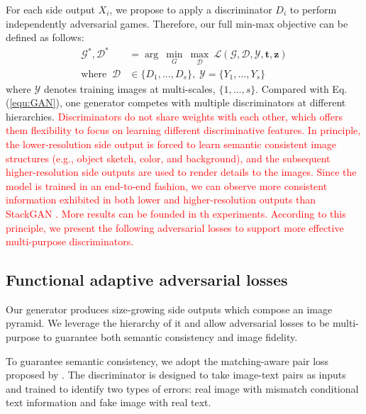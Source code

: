 \documentclass[10pt,twocolumn,letterpaper]{article}
\begin{document}
For each side output $X_i$, we propose to apply a discriminator $D_i$ to perform independently adversarial games. Therefore, our full min-max objective can be defined as follows: 
\begin{equation}
\label{equ:optim}
\begin{split}
  \mathcal{G}^*, \mathcal{D}^*&  =  \arg~\underset{G}{\min}\ \underset{\mathcal{D}}{\max}~ \mathcal{L}(\mathcal{G},\mathcal{D}, \mathcal{Y}, \bm t, \bm z) \\
  \text{where} \;\;	 \mathcal{D} & \in  \{D_1, ..., D_s\}, \; \mathcal{Y} = \{Y_1, ..., Y_s\}
\end{split}
\end{equation}
where $ \mathcal{Y}$ denotes training images at multi-scales, $\{1,...,s\}$.
Compared with Eq. (\ref{equ:GAN}), one generator competes with multiple discriminators at different hierarchies. 
\textcolor{red}{Discriminators do not share weights with each other, which offers them flexibility to focus on learning different discriminative features.
In principle, the lower-resolution side output is forced to learn semantic consistent image structures (e.g., object sketch, color, and background), and the subsequent higher-resolution side outputs are used to render details to the images. 
Since the model is trained in an end-to-end fashion, we can observe more consistent information exhibited in both lower and higher-resolution outputs than StackGAN \cite{han2017stackgan}. More results can be founded in th experiments. 
According to this principle, we present the following adversarial losses to support more effective multi-purpose discriminators.}



\subsection{Functional adaptive adversarial losses}
Our generator produces size-growing side outputs which compose an image pyramid. 
We leverage the hierarchy of it and allow adversarial losses to be multi-purpose to guarantee both semantic consistency and image fidelity. 

To guarantee semantic consistency, we adopt the matching-aware pair loss proposed by \cite{reed2016generative}. The discriminator is designed to take image-text pairs as inputs and trained to identify two types of errors: real image with mismatch conditional text information and fake image with real text.
\end{document}
